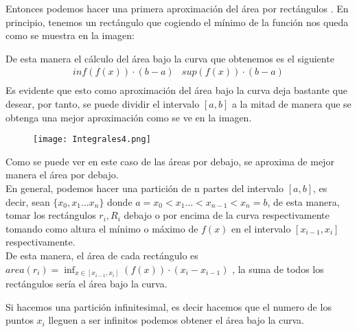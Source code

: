 Entonces podemos hacer una primera aproximación del área por rectángulos . En principio, tenemos un rectángulo que cogiendo el mínimo de la función nos queda como se muestra en la imagen:

\begin{figure}[H]
\graphicspath{{imagenes_analisis/}}

\end{figure}
\noindent
De esta manera el cálculo del área bajo la curva que obtenemos es el siguiente
\begin{equation*}
\begin{array}{rr}
 inf(f(x))\cdot (b-a)& sup(f(x))\cdot(b-a)\\
\end{array}
\end{equation*}
\noindent
Es evidente que esto como aproximación del área bajo la curva deja bastante que desear, por tanto, se puede dividir el intervalo $[a,b]$ a la mitad de manera que se obtenga una mejor aproximación como se ve en la imagen.
\begin{figure}[H]
\begin{center}
\graphicspath{{imagenes_analisis/}}
\texttt{[image: Integrales4.png]}
\label{Función $f(x)$}
\end{center}
\end{figure}
\noindent
Como se puede ver en este caso de las áreas por debajo, se aproxima de mejor manera el área por debajo.\\
\noindent 
En general, podemos hacer una partición de n partes del intervalo $[a,b]$, es decir, sean $\lbrace x_0,x_1\ldots x_n\rbrace$ donde $a=x_0<x_1\ldots<x_{n-1}<x_n=b$, de esta manera, tomar los rectángulos $r_i, R_i$ debajo o por encima de la curva respectivamente tomando como altura el mínimo o máximo de $f(x)$ en el intervalo $[x_{i-1},x_{i}]$ respectivamente.\\
\noindent
De esta manera, el área de cada rectángulo es $\displaystyle area(r_i)=\inf_{x\in{[x_{i-1},x_i]}}(f(x))\cdot (x_{i}-x_{i-1})$ , la suma de todos los rectángulos sería el área bajo la curva. 

Si hacemos una partición infinitesimal, es decir hacemos que el numero de los puntos $x_i$ lleguen a ser infinitos podemos obtener el área bajo la curva. 

